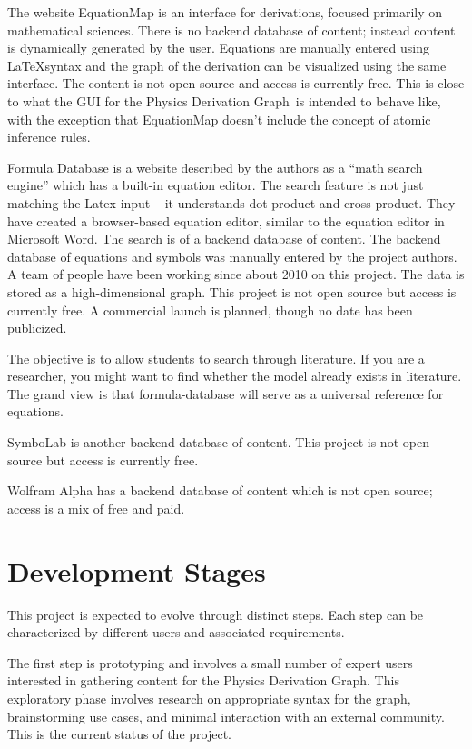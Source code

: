 \documentclass{article}
\newcommand{\pdg}{Physics Derivation Graph}
\begin{document}
\begin{multicols}{2}
The website EquationMap\cite{2015_EquationMap} is an interface for derivations, focused primarily on mathematical sciences. There is no backend database of content; instead content is dynamically generated by the user. Equations are manually entered using \LaTeX syntax and the graph of the derivation can be visualized using the same interface. The content is not open source and access is currently free. This is close to what the GUI for the \pdg\ is intended to behave like, with the exception that EquationMap doesn't include the concept of atomic inference rules.


Formula Database\cite{2015_FormulaDatabase} is a website described by the authors as a ``math search engine'' which has a built-in equation editor. The search feature is not just matching the Latex input -- it understands dot product and cross product. They have created a browser-based equation editor, similar to the equation editor in Microsoft Word. The search is of a backend database of content. The backend database of equations and symbols was manually entered by the project authors. A team of people have been working since about 2010 on this project. The data is stored as a high-dimensional graph. This project is not open source but access is currently free. A commercial launch is planned, though no date has been publicized. 

The objective is to allow students to search through literature. If you are a researcher, you might want to find whether the model already exists in literature. The grand view is that formula-database will serve as a universal reference for equations.


SymboLab\cite{2015_Symbolab} is another backend database of content. This project is not open source but access is currently free. 

Wolfram Alpha\cite{2015_WolframAlpha} has a backend database of content which is not open source; access is a mix of free and paid. 

\section{Development Stages\label{sec:stages}}

This project is expected to evolve through distinct steps. Each step can be characterized by different users and associated requirements. 

The first step is prototyping and involves a small number of expert users interested in gathering content for the \pdg. This exploratory phase involves research on appropriate syntax for the graph, brainstorming use cases, and minimal interaction with an external community. This is the current status of the project.


\end{multicols}
\end{document}
